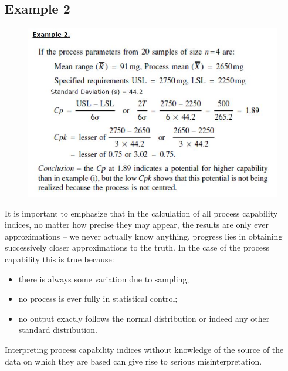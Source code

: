 \documentclass[MASTER-SPC.tex]{subfiles}
\begin{document}
\newpage					
					\subsection*{Example 2}
					
					\begin{figure}[h!]
						\centering
						\includegraphics[width=1\linewidth]{proccapindices/Example2}
					\end{figure}
					
{
	\normalsize
					
\noindent It is important to emphasize that in the calculation of all process capability indices, no matter how precise they may appear, the results are only ever approximations – we never actually know anything, progress lies in obtaining successively closer approximations to the truth. In the case of the process capability this is true because:
					\begin{itemize}
						\item	there is always some variation due to sampling;
						\item	no process is ever fully in statistical control;
						\item	no output exactly follows the normal distribution or indeed any other standard distribution.
					\end{itemize}
					
				
					Interpreting process capability indices without knowledge of the source of the data on which they are based can give rise to serious misinterpretation.
}
\newpage
					
\end{document}
